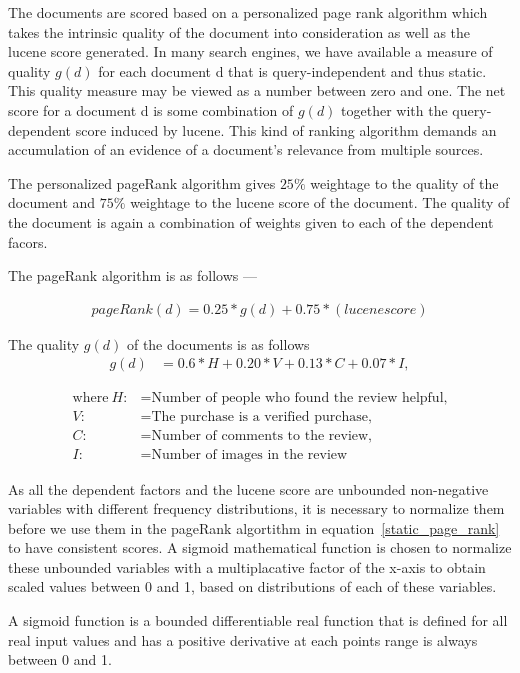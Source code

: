 \documentclass{article}
\begin{document}
The documents are scored based on a personalized page rank algorithm which takes the intrinsic quality of the document into consideration as well as the lucene score generated. In many search engines, we have available a measure of quality $g(d)$ for each document d that is query-independent and thus static. This quality measure may be viewed as a number between zero and one. The net score for a document d is some combination of $g(d)$ together with the query-dependent score induced by lucene. This kind of ranking algorithm demands an accumulation of an evidence of a document's relevance from multiple sources. 

The personalized pageRank algorithm gives $25\%$ weightage to the quality of the document and $75\%$ weightage to the lucene score of the document. The quality of the document is again a combination of weights given to each of the dependent facors.  

The pageRank algorithm is as follows ---

\begin{align}
pageRank(d) = 0.25 * g(d) + 0.75 * (lucene score)
\end{align}

The quality $g(d)$ of the documents is as follows 
\begin{align}
  g(d) &= 0.6 * H  + 0.20 * V + 0.13 * C + 0.07 * I,
  \label{static_page_rank}
\end{align}

\begin{align*}
 \text{where}~H: &= \text{Number of people who found the review helpful,} \\
 V: &= \text{The purchase is a verified purchase,} \\
 C: &= \text{Number of comments to the review,} \\
 I: &= \text{Number of images in the review}
\end{align*}

As all the dependent factors and the lucene score are unbounded non-negative variables with different frequency distributions, it is necessary to normalize them before we use them in the pageRank algortithm in equation~\eqref{static_page_rank} to have consistent scores. A sigmoid mathematical function is chosen to normalize these unbounded variables with a multiplacative factor of the x-axis to obtain scaled values between 0 and 1, based on distributions of each of these variables. 

A sigmoid function is a bounded differentiable real function that is defined for all real input values and has a positive derivative at each points range is always between 0 and 1.
\end{document}
